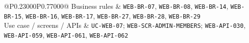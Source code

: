 \begin{longtable}{@{}P{0.23000\SRSWidth}P{0.77000\SRSWidth}@{}}
Business rules & \texttt{WEB-\allowbreak{}BR-\allowbreak{}07}, \texttt{WEB-\allowbreak{}BR-\allowbreak{}08}, \texttt{WEB-\allowbreak{}BR-\allowbreak{}14}, \texttt{WEB-\allowbreak{}BR-\allowbreak{}15}, \texttt{WEB-\allowbreak{}BR-\allowbreak{}16}, \texttt{WEB-\allowbreak{}BR-\allowbreak{}17}, \texttt{WEB-\allowbreak{}BR-\allowbreak{}27}, \texttt{WEB-\allowbreak{}BR-\allowbreak{}28}, \texttt{WEB-\allowbreak{}BR-\allowbreak{}29} \\[3pt]
Use case /\allowbreak{} screens /\allowbreak{} APIs & \texttt{UC-\allowbreak{}WEB-\allowbreak{}07}; \texttt{WEB-\allowbreak{}SCR-\allowbreak{}ADMIN-\allowbreak{}MEMBERS}; \texttt{WEB-\allowbreak{}API-\allowbreak{}030}, \texttt{WEB-\allowbreak{}API-\allowbreak{}059}, \texttt{WEB-\allowbreak{}API-\allowbreak{}061}, \texttt{WEB-\allowbreak{}API-\allowbreak{}062} \\[3pt]
\end{longtable}
\endgroup

